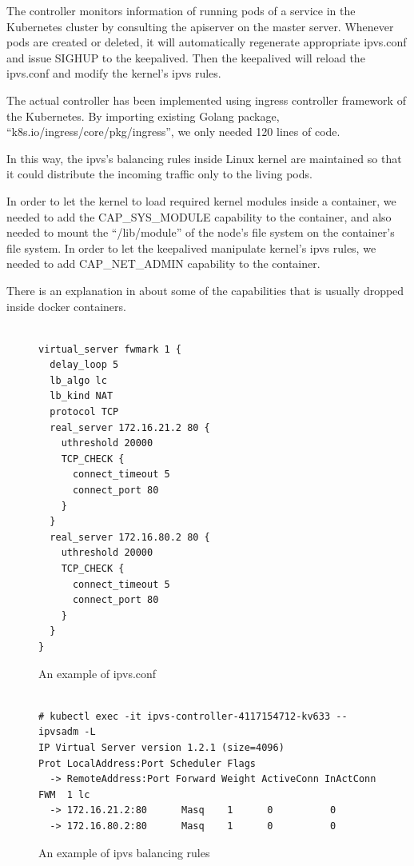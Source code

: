 The controller monitors information of running pods of a service in the Kubernetes cluster by consulting the apiserver on the master server.
Whenever pods are created or deleted, it will automatically regenerate appropriate ipvs.conf and issue SIGHUP to the keepalived.
Then the keepalived will reload the ipvs.conf and modify the kernel's ipvs rules.  

The actual controller\cite{ktaka_ccmp_2017_826894} has been implemented using ingress controller\cite{K8sIngress2017} framework of the Kubernetes.
By importing existing Golang package, \enquote{k8s.io/ingress/core/pkg/ingress},
we only needed 120 lines of code.  

In this way, the ipvs's balancing rules inside Linux kernel are maintained so that it could distribute the incoming traffic only to the living pods.

In order to let the kernel to load required kernel modules inside a container, 
we needed to add the CAP\_SYS\_MODULE capability to the container, 
and also needed to mount the \enquote{/lib/module} of the node's file system on the container's file system.   
In order to let the keepalived manipulate kernel's ipvs rules, 
we needed to add CAP\_NET\_ADMIN capability to the container.

There is an explanation in \cite{mp2016enhancing} about some of the capabilities 
that is usually dropped inside docker containers.

\begin{figure}
\begin{minipage}{0.7\columnwidth}
\begin{verbatim}

virtual_server fwmark 1 {
  delay_loop 5
  lb_algo lc
  lb_kind NAT
  protocol TCP
  real_server 172.16.21.2 80 {
    uthreshold 20000
    TCP_CHECK {
      connect_timeout 5
      connect_port 80
    }
  }
  real_server 172.16.80.2 80 {
    uthreshold 20000
    TCP_CHECK {
      connect_timeout 5
      connect_port 80
    }
  }
}

\end{verbatim}
\end{minipage}
\caption{An example of ipvs.conf}
\label{fig:ipvs.conf}
\end{figure}

\begin{figure}
\begin{minipage}{\columnwidth}
\small
\begin{verbatim}

# kubectl exec -it ipvs-controller-4117154712-kv633 -- ipvsadm -L
IP Virtual Server version 1.2.1 (size=4096)
Prot LocalAddress:Port Scheduler Flags
  -> RemoteAddress:Port Forward Weight ActiveConn InActConn
FWM  1 lc
  -> 172.16.21.2:80      Masq    1      0          0         
  -> 172.16.80.2:80      Masq    1      0          0

\end{verbatim}
\end{minipage}
\caption{An example of ipvs balancing rules}
\label{fig:ipvs rule}
\end{figure}

